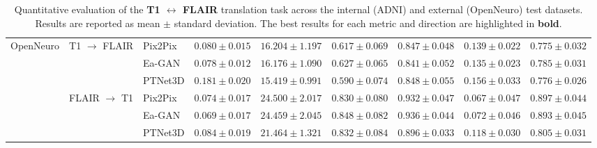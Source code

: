 \documentclass[11pt,a4paper]{article}
\begin{document}
\begin{table}[H]
{\begin{tabular}{lllcccccc}
\multirow{6}{*}{OpenNeuro} 
    & \multirow{3}{*}{T1 $\rightarrow$ FLAIR} 
                & Pix2Pix & $0.080 \pm 0.015$ & $\mathbf{16.204 \pm 1.197}$ & $0.617 \pm 0.069$ & $0.847 \pm 0.048$ & $0.139 \pm 0.022$ & $0.775 \pm 0.032$ \\
    &           & Ea-GAN  & $\mathbf{0.078 \pm 0.012}$ & $16.176 \pm 1.090$ & $\mathbf{0.627 \pm 0.065}$ & $0.841 \pm 0.052$ & $\mathbf{0.135 \pm 0.023}$ & $\mathbf{0.785 \pm 0.031}$ \\
    &           & PTNet3D & $0.181 \pm 0.020$ & $15.419 \pm 0.991$ & $0.590 \pm 0.074$ & $\mathbf{0.848 \pm 0.055}$ & $0.156 \pm 0.033$ & $0.776 \pm 0.026$ \\
\cline{2-9}\noalign{\smallskip}
    & \multirow{3}{*}{FLAIR $\rightarrow$ T1} 
                & Pix2Pix & $0.074 \pm 0.017$ & $\mathbf{24.500 \pm 2.017}$ & $0.830 \pm 0.080$ & $0.932 \pm 0.047$ & $\mathbf{0.067 \pm 0.047}$ & $\mathbf{0.897 \pm 0.044}$ \\
    &           & Ea-GAN  & $\mathbf{0.069 \pm 0.017}$ & $24.459 \pm 2.045$ & $\mathbf{0.848 \pm 0.082}$ & $\mathbf{0.936 \pm 0.044}$ & $0.072 \pm 0.046$ & $0.893 \pm 0.045$ \\
    &           & PTNet3D & $0.084 \pm 0.019$ & $21.464 \pm 1.321$ & $0.832 \pm 0.084$ & $0.896 \pm 0.033$ & $0.118 \pm 0.030$ & $0.805 \pm 0.031$ \\
\hline\hline

\end{tabular}%
}

\vspace{2mm}
\caption{Quantitative evaluation of the \textbf{T1 $\leftrightarrow$ FLAIR} translation task across the internal (ADNI) and external (OpenNeuro) test datasets. Results are reported as mean $\pm$ standard deviation. The best results for each metric and direction are highlighted in \textbf{bold}.}
\label{tab:results_t1_flair_full}
\end{table}
\end{document}
